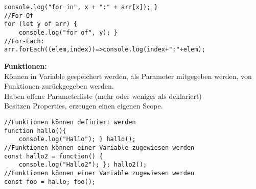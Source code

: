 \documentclass[7pt,landscape,a4paper]{scrartcl}
\begin{document}
\begin{multicols*}{4}
$$\begin{lstlisting}[style=htmlcssjs]
	console.log("for in", x + ":" + arr[x]); }
//For-Of
for (let y of arr) {
	console.log("for of", y); }
//For-Each:
arr.forEach((elem,index))=>console.log(index+":"+elem);
\end{lstlisting}
	\textcolor{b}{\textbf{Funktionen:}}\\
	Können in \textcolor{b}{Variable} gespeichert werden, als \textcolor{b}{Parameter} mitgegeben werden, von Funktionen \textcolor{b}{zurückgegeben} werden.\\
	Haben \textcolor{b}{offene Parameterliste} (mehr oder weniger als deklariert)\\
	Besitzen \textcolor{b}{Properties}, erzeugen einen eigenen \textcolor{b}{Scope}. 
\begin{lstlisting}[style=htmlcssjs]
//Funktionen können definiert werden
function hallo(){
	console.log("Hallo"); } hallo();
//Funktionen können einer Variable zugewiesen werden
const hallo2 = function() {
	console.log("Hallo2"); }; hallo2();
//Funktionen können einer Variable zugewiesen werden
const foo = hallo; foo();
\end{lstlisting}

\end{multicols*}
\end{document}
